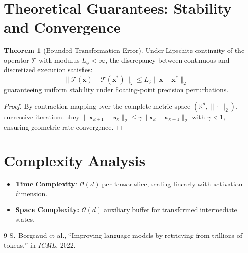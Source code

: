 \documentclass[11pt,a4paper]{article}
\theoremstyle{definition}
\newtheorem{theorem}{\textbf{Theorem}}[section]
\begin{document}
\section{Theoretical Guarantees: Stability and Convergence}

\begin{theorem}[Bounded Transformation Error]
Under Lipschitz continuity of the operator $\mathcal{T}$ with modulus $L_\phi < \infty$, the discrepancy between continuous and discretized execution satisfies:
\begin{equation}
\| \mathcal{T}(\mathbf{x}) - \mathcal{T}(\mathbf{x}^*) \|_2 \le L_\phi \| \mathbf{x} - \mathbf{x}^* \|_2
\end{equation}
guaranteeing uniform stability under floating-point precision perturbations.
\end{theorem}

\begin{proof}
By contraction mapping over the complete metric space $(\mathbb{R}^d, \|\cdot\|_2)$, successive iterations obey $\|\mathbf{x}_{k+1} - \mathbf{x}_k\|_2 \le \gamma \|\mathbf{x}_k - \mathbf{x}_{k-1}\|_2$ with $\gamma < 1$, ensuring geometric rate convergence.
\end{proof}

\section{Complexity Analysis}

\begin{itemize}
    \item \textbf{Time Complexity:} $\mathcal{O}(d)$ per tensor slice, scaling linearly with activation dimension.
    \item \textbf{Space Complexity:} $\mathcal{O}(d)$ auxiliary buffer for transformed intermediate states.
\end{itemize}

\begin{thebibliography}{9}
 S.~Borgeaud et al., ``Improving language models by retrieving from trillions of tokens,'' in \emph{ICML}, 2022.
\end{thebibliography}
\end{document}
